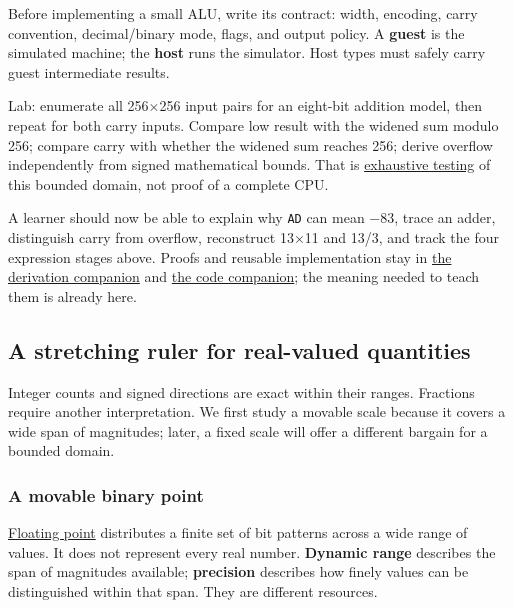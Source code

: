 \hypertarget{01-foundations-i-ch001-integer-laboratory-and-teaching-checkpoint}{}

Before implementing a small ALU, write its contract: width, encoding, carry convention, decimal/binary mode, flags, and output policy. A \textbf{guest} is the simulated machine; the \textbf{host} runs the simulator. Host types must safely carry guest intermediate results.

Lab: enumerate all 256×256 input pairs for an eight-bit addition model, then repeat for both carry inputs. Compare low result with the widened sum modulo 256; compare carry with whether the widened sum reaches 256; derive overflow independently from signed mathematical bounds. That is \hyperref[appendix-05db24ccc28a]{exhaustive testing} of this bounded domain, not proof of a complete CPU.

A learner should now be able to explain why \texttt{AD} can mean −83, trace an adder, distinguish carry from overflow, reconstruct 13×11 and 13/3, and track the four expression stages above. Proofs and reusable implementation stay in \hyperref[01-foundations-i-ch011-m002---signed-representations-adders-and-arithmetic-policies]{the derivation companion} and \hyperref[appendix-4e2236f53445-m002---exhaustive-8-bit-addition-oracle-and-saturation]{the code companion}; the meaning needed to teach them is already here.

\subsection{A stretching ruler for real-valued quantities}\label{01-foundations-i-ch001-a-stretching-ruler-for-real-valued-quantities}

\hypertarget{01-foundations-i-ch001-a-stretching-ruler-for-real-valued-quantities}{}

Integer counts and signed directions are exact within their ranges. Fractions require another interpretation. We first study a movable scale because it covers a wide span of magnitudes; later, a fixed scale will offer a different bargain for a bounded domain.

\subsubsection{A movable binary point}\label{01-foundations-i-ch001-a-movable-binary-point}

\hypertarget{01-foundations-i-ch001-a-movable-binary-point}{}

\hyperref[appendix-343615f49ddf]{Floating point} distributes a finite set of bit patterns across a wide range of values. It does not represent every real number. \textbf{Dynamic range} describes the span of magnitudes available; \textbf{precision} describes how finely values can be distinguished within that span. They are different resources.

